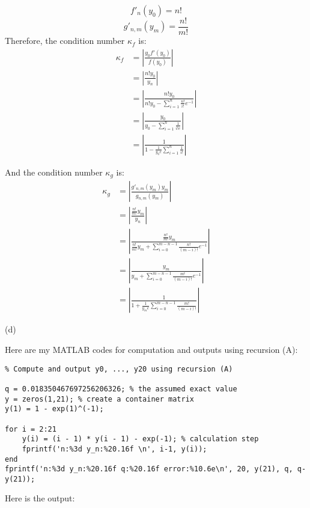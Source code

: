 \documentclass[12pt]{article}
\begin{document}
\begin{equation*}
f'_n(y_0) = n!
\end{equation*}
\begin{equation*}
g'_{n,m}(y_m) = \frac{n!}{m!}
\end{equation*}
Therefore, the condition number $\kappa_f$ is:
\begin{equation*}
\begin{split}
\kappa_f &= |\frac{y_0 f'(y_0)}{f(y_0)}|\\
&= |\frac{n!y_0}{y_n}|\\
&= |\frac{n!y_0}{n!y_0-\sum_{i = 1}^n \frac{n!}{i!}e^{-1}}|\\
&= |\frac{y_0}{y_0-\sum_{i = 1}^n \frac{1}{i!e}}|\\
&= |\frac{1}{1-\frac{1}{y_0 e}\sum_{i = 1}^n \frac{1}{i!}}|
\end{split}
\end{equation*}

And the condition number $\kappa_g$ is:
\begin{equation*}
\begin{split}
\kappa_g &= |\frac{g'_{n,m}(y_m)y_m}{g_{n,m}(y_m)}|\\
&= |\frac{\frac{n!}{m!}y_m}{y_n}|\\
&= |\frac{\frac{n!}{m!}y_m}{\frac{n!}{m!}y_m + \sum_{i = 0}^{m-n-1}\frac{n!}{(m-i)!}e^{-1}}|\\
&= |\frac{y_m}{y_m+\sum_{i = 0}^{m-n-1}\frac{m!}{(m-i)!}e^{-1}}|\\
&= |\frac{1}{1+\frac{1}{y_me}\sum_{i = 0}^{m-n-1}\frac{m!}{(m-i)!}}|
\end{split}
\end{equation*}

(d)

Here are my MATLAB codes for computation and outputs using recursion (A):\\
\begin{lstlisting}
% Compute and output y0, ..., y20 using recursion (A)

q = 0.018350467697256206326; % the assumed exact value
y = zeros(1,21); % create a container matrix
y(1) = 1 - exp(1)^(-1);

for i = 2:21
    y(i) = (i - 1) * y(i - 1) - exp(-1); % calculation step
    fprintf('n:%3d y_n:%20.16f \n', i-1, y(i));
end
fprintf('n:%3d y_n:%20.16f q:%20.16f error:%10.6e\n', 20, y(21), q, q-y(21));
\end{lstlisting}

Here is the output:\\
\end{document}
